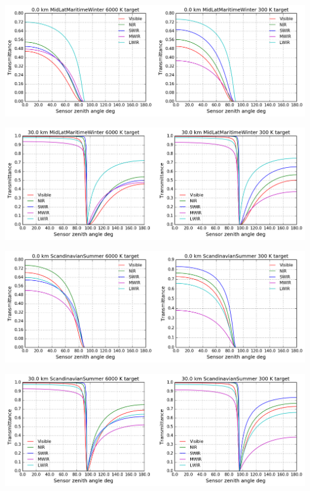 \documentclass{workpackage}
\begin{document}
\begin{center}
\includegraphics{./pic/Analyse-Standard-Atmospheres_43_6.png}
\end{center}

\begin{center}
\includegraphics{./pic/Analyse-Standard-Atmospheres_43_7.png}
\end{center}

\begin{center}
\includegraphics{./pic/Analyse-Standard-Atmospheres_43_8.png}
\end{center}

\begin{center}
\includegraphics{./pic/Analyse-Standard-Atmospheres_43_9.png}
\end{center}
\end{document}
